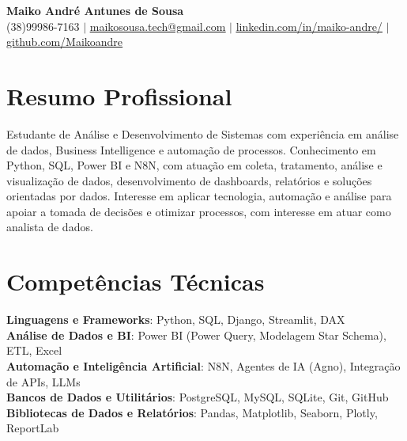 \documentclass[letterpaper,11pt]{article}
\begin{document}

\begin{center}
    \textbf{\Huge Maiko André Antunes de Sousa} \\ \vspace{1pt}
    \small (38)99986-7163 $|$ \href{mailto:x@x.com}{\underline{maikosousa.tech@gmail.com}} $|$ %
    \href{https://www.linkedin.com/in/maiko-andre/}{\underline{linkedin.com/in/maiko-andre/}} $|$
    \href{https://github.com/Maikoandre}{\underline{github.com/Maikoandre}}
\end{center}

\section{Resumo Profissional}
  \textbf{}{Estudante de Análise e Desenvolvimento de Sistemas com experiência em análise de dados, 
  Business Intelligence e automação de processos. Conhecimento em Python, SQL, Power BI e N8N, 
  com atuação em coleta, tratamento, análise e visualização de dados, desenvolvimento de dashboards, 
  relatórios e soluções orientadas por dados. Interesse em aplicar tecnologia, 
  automação e análise para apoiar a tomada de decisões e otimizar processos, com interesse em atuar como analista de dados.
}

\section{Competências Técnicas}
 \begin{itemize}[leftmargin=0.15in, label={}]
    \small{\item{
     \textbf{Linguagens e Frameworks}{: Python, SQL, Django, Streamlit, DAX} \\
     \textbf{Análise de Dados e BI}{: Power BI (Power Query, Modelagem Star Schema), ETL, Excel} \\
     \textbf{Automação e Inteligência Artificial}{: N8N, Agentes de IA (Agno), Integração de APIs, LLMs} \\
     \textbf{Bancos de Dados e Utilitários}{: PostgreSQL, MySQL, SQLite, Git, GitHub} \\
     \textbf{Bibliotecas de Dados e Relatórios}{: Pandas, Matplotlib, Seaborn, Plotly, ReportLab}
    }}
 \end{itemize}
\end{document}
